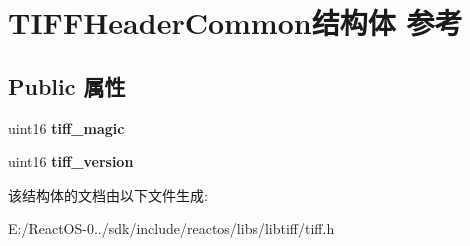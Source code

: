 \hypertarget{struct_t_i_f_f_header_common}{}\section{T\+I\+F\+F\+Header\+Common结构体 参考}
\label{struct_t_i_f_f_header_common}
\subsection*{Public 属性}
\begin{DoxyCompactItemize}
\item 
\mbox{\label{struct_t_i_f_f_header_common_a40af49020890afdc649f1a46f9ed5d52}} 
uint16 {\bfseries tiff\+\_\+magic}
\item 
\mbox{\label{struct_t_i_f_f_header_common_a0f73f5dc2b30c57881857e0cccf05e70}} 
uint16 {\bfseries tiff\+\_\+version}
\end{DoxyCompactItemize}


该结构体的文档由以下文件生成\+:\begin{DoxyCompactItemize}
\item 
E\+:/\+React\+O\+S-\/0../sdk/include/reactos/libs/libtiff/tiff.\+h\end{DoxyCompactItemize}
